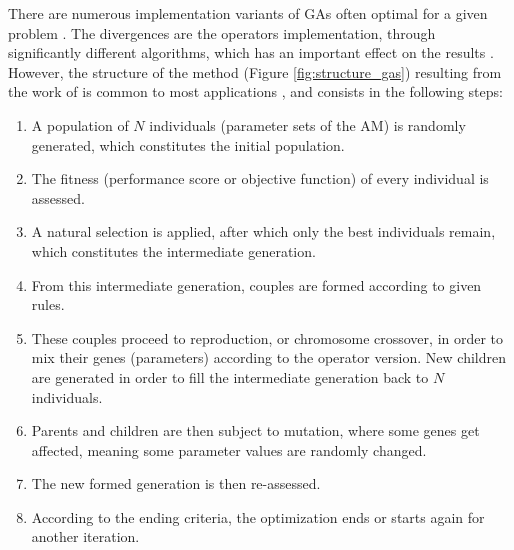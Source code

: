 \documentclass[twocol]{ametsoc}
\begin{document}
There are numerous implementation variants of GAs often optimal for a given problem \citep{Hart1991a,Schraudolph1992a}. The divergences are the operators implementation, through significantly different algorithms, which has an important effect on the results \citep{Gaffney2010a}. However, the structure of the method (Figure \ref{fig:structure_gas}) resulting from the work of \citet{Holland1992b} is common to most applications \citep{Back1993b}, and consists in the following steps:

\begin{enumerate}
	\item A population of $N$ individuals (parameter sets of the AM) is randomly generated, which constitutes the initial population.
	\item The fitness (performance score or objective function) of every individual is assessed.
	\item A natural selection is applied, after which only the best individuals remain, which constitutes the intermediate generation.
	\item From this intermediate generation, couples are formed according to given rules.
	\item These couples proceed to reproduction, or chromosome crossover, in order to mix their genes (parameters) according to the operator version. New children are generated in order to fill the intermediate generation back to $N$ individuals.
	\item Parents and children are then subject to mutation, where some genes get affected, meaning some parameter values are randomly changed.
	\item The new formed generation is then re-assessed.
	\item According to the ending criteria, the optimization ends or starts again for another iteration.
\end{enumerate}
\end{document}
